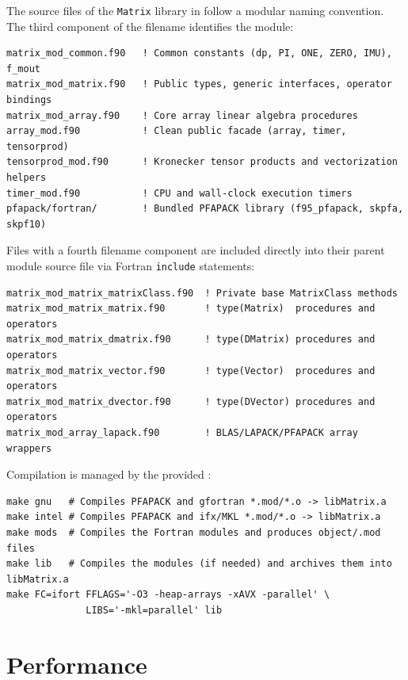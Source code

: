 The source files of the \texttt{Matrix} library in  follow a modular naming convention. The third component of the filename identifies the module:
\lstset{language=[95]Fortran}
\begin{lstlisting}
matrix_mod_common.f90   ! Common constants (dp, PI, ONE, ZERO, IMU), f_mout
matrix_mod_matrix.f90   ! Public types, generic interfaces, operator bindings
matrix_mod_array.f90    ! Core array linear algebra procedures
array_mod.f90           ! Clean public facade (array, timer, tensorprod)
tensorprod_mod.f90      ! Kronecker tensor products and vectorization helpers
timer_mod.f90           ! CPU and wall-clock execution timers
pfapack/fortran/        ! Bundled PFAPACK library (f95_pfapack, skpfa, skpf10)
\end{lstlisting}

Files with a fourth filename component are included directly into their parent module source file via Fortran \texttt{include} statements:
\lstset{language=[95]Fortran}
\begin{lstlisting}
matrix_mod_matrix_matrixClass.f90  ! Private base MatrixClass methods
matrix_mod_matrix_matrix.f90       ! type(Matrix)  procedures and operators
matrix_mod_matrix_dmatrix.f90      ! type(DMatrix) procedures and operators
matrix_mod_matrix_vector.f90       ! type(Vector)  procedures and operators
matrix_mod_matrix_dvector.f90      ! type(DVector) procedures and operators
matrix_mod_array_lapack.f90        ! BLAS/LAPACK/PFAPACK array wrappers
\end{lstlisting}

Compilation is managed by the provided :
\lstset{language=bash}
\begin{lstlisting}
make gnu   # Compiles PFAPACK and gfortran *.mod/*.o -> libMatrix.a
make intel # Compiles PFAPACK and ifx/MKL *.mod/*.o -> libMatrix.a
make mods  # Compiles the Fortran modules and produces object/.mod files
make lib   # Compiles the modules (if needed) and archives them into libMatrix.a
make FC=ifort FFLAGS='-O3 -heap-arrays -xAVX -parallel' \
              LIBS='-mkl=parallel' lib
\end{lstlisting}

\section{Performance}
\label{sec:performance}

